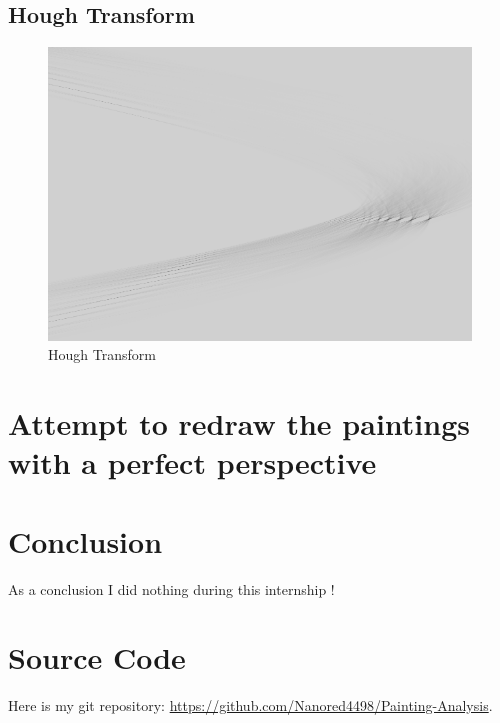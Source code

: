 \documentclass[10pt]{article}
\begin{document}
	\subsection{Hough Transform}
	
	\begin{figure}[h]
		\centering
		\includegraphics[scale=1.2]{hough_painting.png}
		\caption{Hough Transform}
	\end{figure}

	\section{Attempt to redraw the paintings with a perfect perspective}

	\section{Conclusion}
	
	As a conclusion I did nothing during this internship !
	
	\appendix
	
	\section{Source Code}
	
	Here is my git repository: \url{https://github.com/Nanored4498/Painting-Analysis}.

	
	
	
\end{document}
